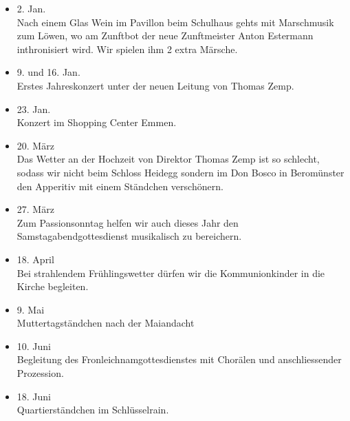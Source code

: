 \begin{history}


    \begin{itemize}

        \item[]2. Jan.\\
        Nach einem Glas Wein im Pavillon beim Schulhaus gehts mit Marschmusik
        zum Löwen, wo am Zunftbot der neue Zunftmeister Anton Estermann
        inthronisiert wird. Wir spielen ihm 2 extra Märsche.

        \item[]9. und 16. Jan.\\
        Erstes Jahreskonzert unter der neuen Leitung von Thomas Zemp.

        \item[]23. Jan.\\
        Konzert im Shopping Center Emmen.

        \item[]20. März\\
        Das Wetter an der Hochzeit von Direktor Thomas Zemp ist so schlecht,
        sodass wir nicht beim Schloss Heidegg sondern im Don Bosco in
        Beromünster den Apperitiv mit einem Ständchen verschönern.

        \item[]27. März\\
        Zum Passionsonntag helfen wir auch dieses Jahr den
        Samstagabendgottesdienst musikalisch zu bereichern.

        \item[]18. April\\
        Bei strahlendem Frühlingswetter dürfen wir die Kommunionkinder in die
        Kirche begleiten.

        \item[]9. Mai\\
        Muttertagständchen nach der Maiandacht

        \item[]10. Juni\\
        Begleitung des Fronleichnamgottesdienstes mit Chorälen und
        anschliessender Prozession.

        \item[]18. Juni\\
        Quartierständchen im Schlüsselrain.


\end{itemize}
\end{history}
